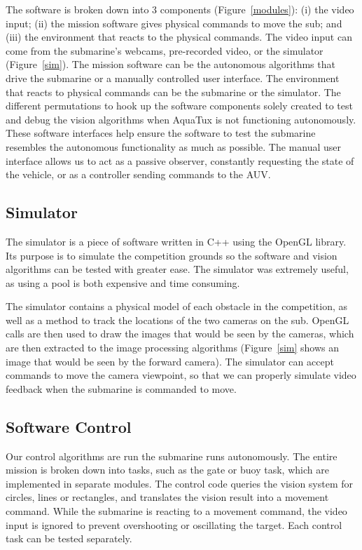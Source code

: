 The software is broken down into 3
components (Figure~\ref{modules}): (i) the video input;
(ii) the mission software gives physical commands to move the sub;
and (iii) the environment that reacts to the physical commands.
The video input can come from the submarine's webcams, pre-recorded video,
or the simulator (Figure~\ref{sim}). The mission software can be the autonomous
algorithms that drive the submarine or a manually controlled user interface.
The environment that reacts to physical commands can be the submarine or the
simulator. The different permutations to hook up the software components
solely created to test and debug the vision
algorithms when AquaTux is not functioning autonomously.
These software interfaces help ensure the software to test the submarine
resembles the autonomous functionality as much as possible.
The manual user interface allows us to act as a passive observer,
constantly requesting the state of the vehicle,
or as a controller sending commands to the AUV.

\subsection{Simulator}
The simulator is a piece of software written in C++ using the OpenGL library. Its purpose is to simulate the competition grounds so the software and vision algorithms can be tested with greater ease. The simulator was extremely useful, as using a pool is both expensive and time consuming.

The simulator contains a physical model of each obstacle in the competition,  as well as a method to track the locations of the two cameras on the sub. OpenGL calls are then used to draw the images that would be seen by the cameras, which are then extracted to the image processing algorithms (Figure~\ref{sim} shows an image that would be seen by the forward camera).
The simulator can accept commands to move the camera viewpoint, so that we can properly simulate video feedback when the submarine is commanded to move.

\subsection{Software Control}
Our control algorithms are run the submarine runs autonomously. The entire mission is broken down into tasks, such as the gate or buoy task,
which are implemented in separate modules. The control code queries the vision system for circles, lines or rectangles, and translates the
vision result into a movement command. While the submarine is reacting to a movement command, the video input is ignored to prevent
overshooting or oscillating the target.
Each control task can be tested separately.

